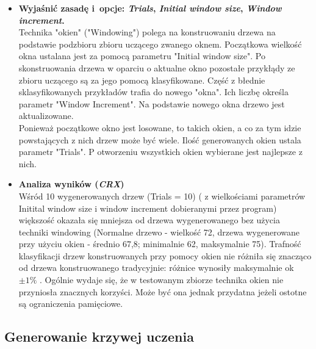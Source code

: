 \begin{itemize}
\item \textbf{Wyjaśnić zasadę i~opcje: \emph{Trials}, \emph{Initial window size}, \emph{Window increment}.}
\\Technika "okien" ("Windowing") polega na konstruowaniu drzewa na podstawie podzbioru zbioru uczącego zwanego oknem. Początkowa wielkość okna ustalana jest za pomocą parametru "Initial window size". Po skonstruowania drzewa w oparciu o aktualne okno pozostałe przykłądy ze zbioru uczącego są za jego pomocą klasyfikowane. Część z błednie sklasyfikowanych przykładów trafia do nowego "okna". Ich liczbę określa parametr "Window Increment". Na podstawie nowego okna drzewo jest aktualizowane.
\\Ponieważ początkowe okno jest losowane, to takich okien, a co za tym idzie powstających z nich drzew może być wiele. Ilość generowanych okien ustala parametr "Trials". P otworzeniu wszystkich okien wybierane jest najlepsze z nich.

\item \textbf{Analiza wyników (\emph{CRX})}
\\Wśród 10 wygenerowanych drzew (Trials = 10) ( z wielkościami parametrów Initital window size i window increment dobieranymi przez program) większość okazała się mniejsza od drzewa wygenerowanego bez użycia techniki windowing (Normalne drzewo - wielkość 72, drzewa wygenerowane przy użyciu okien - średnio 67,8; minimalnie 62, maksymalnie 75). Trafność klasyfikacji drzew konstruowanych przy pomocy okien nie różniła się znacząco od drzewa konstruowanego tradycyjnie: różnice wynosiły maksymalnie ok $ \pm 1\% $ . Ogólnie wydaje się, że w testowanym zbiorze technika okien nie przyniosła znacznych korzyści. Może być ona jednak przydatna jeżeli ostotne są ograniczenia pamięciowe.
\end{itemize}

\subsection{Generowanie krzywej uczenia}

